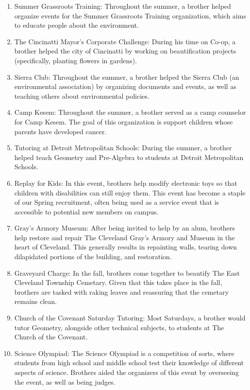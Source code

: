     \begin{enumerate}
      \item Summer Grassroots Training: Throughout the summer, a brother helped organize events for the Summer Grassroots Training organization, which aims to educate people about the environment.
      \item The Cincinatti Mayor's Corporate Challenge: During his time on Co-op, a brother helped the city of Cincinatti by working on beautification projects (specifically, planting flowers in gardens).
      \item Sierra Club: Throughout the summer, a brother helped the Sierra Club (an environmental association) by organizing documents and events, as well as teaching others about environmental policies.
      \item Camp Kesem: Throughout the summer, a brother served as a camp counselor for Camp Kesem. The goal of this organization is support children whose parents have developed cancer.
      \item Tutoring at Detroit Metropolitan Schools: During the summer, a brother helped teach Geometry and Pre-Algebra to students at Detroit Metropolitan Schools.
      \item Replay for Kids: In this event, brothers help modify electronic toys so that children with disabilities can still enjoy them. This event has become a staple of our Spring recruitment, often being used as a service event that is accessible to potential new members on campus.
      \item Gray's Armory Museum: After being invited to help by an alum, brothers help restore and repair The Cleveland Gray's Armory and Museum in the heart of Cleveland. This generally results in repainting walls, tearing down dilapidated portions of the building, and restoration.
      \item Graveyard Charge: In the fall, brothers come together to beautify The East Cleveland Township Cemetary. Given that this takes place in the fall, brothers are tasked with raking leaves and reassuring that the cemetary remains clean.
      \item Church of the Covenant Saturday Tutoring: Most Saturdays, a brother would tutor Geometry, alongside other technical subjects, to students at The Church of the Covenant.
      \item Science Olympiad: The Science Olympiad is a competition of sorts, where students from high school and middle school test their knowledge of different aspects of science. Brothers aided the organizers of this event by overseeing the event, as well as being judges.

\end{enumerate}

